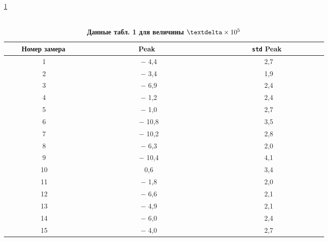 \documentclass[a5paper,openany]{book}
\renewcommand{\delta}{\text{\textdelta}}
\newcommand{\TABLENAME}{\raggedleft\small\textit{\tablename}\hspace{1mm}}
\begin{document}
{\begin{table}[h!]
		\TABLENAME \ref{TableData}
		\caption{\\  {\bfseries\small Данные табл. 1 для величины $\delta \times 10^{5}$}  \cite{Pgamma1992}}
	\label{TableData}
	\begin{center}
		\begin{tabular}{| c | c | c | }
				\hline
{\small	~~~	Номер замера~~~~} & {\small~~~~~~~~~~~~~Peak~~~~~~~~~~~~~~} &  {\small ~~~~~~~~~{\tt std}  Peak~~~~~~~~~~} \\ %
			\hline
			1 &	$-$ 4,4 & 2,7 \\ %
			2 & $-$ 3,4 & 1,9 \\ %
			3 & $-$ 6,9 & 2,4 \\ %
							4 &	$-$ 1,2 & 2,4 \\ %
							5 &	$-$ 1,0 & 2,7 \\ %
							6 &	$-$ 10,8 &	3,5 \\ %
							7 &	$-$ 10,2 &	2,8 \\ %
			8 &	$-$ 6,3 &	2,0 \\ %
							9 &	$-$ 10,4 &	4,1 \\ %
							10 & 0,6& 3,4 \\ %
							11 &$-$ 1,8 &	2,0 \\ %
			12 &$-$ 6,6 & 2,1	\\ %
			13 &$-$ 4,9 &2,1 \\ %
			14 &$-$ 6,0 &	2,4 \\ %
			15 &$-$ 4,0 & 2,7 \\ %
			\hline	
		\end{tabular}
	\end{center}
\end{table}

}
\end{document}
